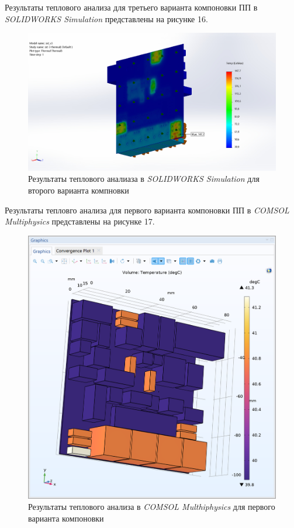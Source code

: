 Результаты теплового анализа для третьего варианта компоновки ПП в
\textit{SOLIDWORKS Simulation} представлены на рисунке 16.
\begin{figure}[h]
  \centering
  \includegraphics[scale=0.3]{../img/sst-3/thermal/sst_v3-sst-3-thermal-Thermal-Thermal3.jpg}
  \caption{Результаты теплового аналиаза в \textit{SOLIDWORKS Simulation}
    для второго варианта компновки}
\end{figure}

Результаты тепловго анализа для первого варианта компоновки ПП в
\textit{COMSOL Multiphysics} представлены на рисунке 17.
\begin{figure}[h]
  \centering
  \includegraphics[scale=0.5]{../img/scrot/Screenshot-2024-05-16-022638.png}
  \caption{Результаты теплового анализа в \textit{COMSOL Multhiphysics}
    для первого варианта компоновки}
\end{figure}

